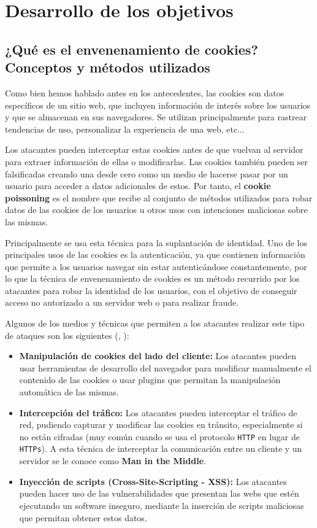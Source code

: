 \section{Desarrollo de los objetivos}

\subsection{¿Qué es el envenenamiento de cookies? Conceptos y métodos utilizados}

Como bien hemos hablado antes en los antecedentes, las cookies son datos específicos de un sitio web, que incluyen información de interés sobre los usuarios y que se almacenan en sus navegadores. Se utilizan principalmente para rastrear tendencias de uso, personalizar la experiencia de una web, etc...

Los atacantes pueden interceptar estas cookies antes de que vuelvan al servidor para extraer información de ellas o modificarlas. Las cookies también pueden ser falsificadas creando una desde cero como un medio de hacerse pasar por un usuario para acceder a datos adicionales de estos. Por tanto, el \textbf{cookie poissoning} es el nombre que recibe al conjunto de métodos utilizados para robar datos de las cookies de los usuarios u otros usos con intenciones maliciosas sobre las mismas.

Principalmente se usa esta técnica para la suplantación de identidad. Uno de los principales usos de las cookies es la autenticación, ya que contienen información que permite a los usuarios navegar sin estar autenticándose constantemente, por lo que la técnica de envenenamiento de cookies es un método recurrido por los atacantes para robar la identidad de los usuarios, con el objetivo de conseguir acceso no autorizado a un servidor web o para realizar fraude.

Algunos de los medios y técnicas que permiten a los atacantes realizar este tipo de ataques son los siguientes (\cite{techtarget2024cookie}, \cite{accessq2024envenenamiento}):

\begin{itemize}
    \item \textbf{Manipulación de cookies del lado del cliente:} Los atacantes pueden usar herramientas de desarrollo del navegador para modificar manualmente el contenido de las cookies o usar plugins que permitan la manipulación automática de las mismas.

    \item \textbf{Intercepción del tráfico:} Los atacantes pueden interceptar el tráfico de red, pudiendo capturar y modificar las cookies en tránsito, especialmente si no están cifradas (muy común cuando se usa el protocolo \texttt{HTTP} en lugar de \texttt{HTTPs}). A esta técnica de interceptar la comunicación entre un cliente y un servidor se le conoce como \textbf{Man in the Middle}.

    \item \textbf{Inyección de scripts (Cross-Site-Scripting - XSS):} Los atacantes pueden hacer uso de las vulnerabilidades que presentan las webs que estén ejecutando un software inseguro, mediante la inserción de scripts maliciosas que permitan obtener estos datos.
\end{itemize}

